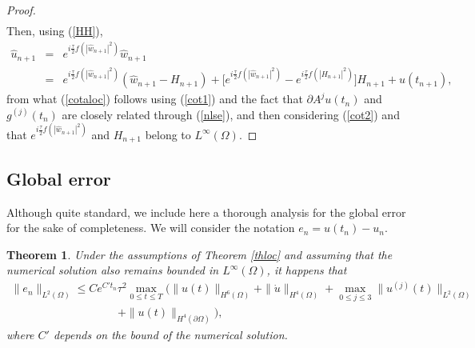 \documentclass[a4paper,12pt]{article}
\newtheorem{theorem}{Theorem}
\begin{document}
\begin{proof}
\begin{eqnarray}
\label{cot2}
\end{eqnarray}
Then, using (\ref{HH}),
\begin{eqnarray}
\hat{u}_{n+1}&=&e^{i \frac{\tau}{2} f(|\hat{w}_{n+1}|^2)} \hat{w}_{n+1}
\nonumber \\
&=& e^{i \frac{\tau}{2} f(|\hat{w}_{n+1}|^2)}(\hat{w}_{n+1}-H_{n+1})+\big[e^{i \frac{\tau}{2}f(|\hat{w}_{n+1}|^2)}-e^{i \frac{\tau}{2}f(|H_{n+1}|^2)} \big]H_{n+1}+u(t_{n+1}),  \nonumber
\end{eqnarray}
from what (\ref{cotaloc}) follows using (\ref{cot1}) and the fact that $\partial A^j u(t_n)$ and $g^{(j)}(t_n)$ are closely related through (\ref{nlse}), and then considering (\ref{cot2}) and that $e^{i \frac{\tau}{2}f(|\hat{w}_{n+1}|^2)}$ and $H_{n+1}$ belong to $L^\infty(\Omega)$.
\end{proof}



\subsection{Global error }

Although quite standard, we include here a thorough analysis for the global error for the sake of completeness. We will consider the notation $e_n=u(t_n)-u_n$.


\begin{theorem} Under the assumptions of Theorem \ref{thloc} and assuming that the numerical solution also remains bounded in $L^\infty(\Omega)$, it happens that
\begin{eqnarray}
\|e_n\|_{L^2(\Omega)} \le C e^{C' t_n} \tau^2 \max_{0 \le t \le T} (\|u(t)\|_{H^6(\Omega)}+\|\dot{u}\|_{H^4(\Omega)}+\max_{0\le j \le 3} \|u^{(j)}(t)\|_{L^2(\Omega)} \nonumber \\
\hspace{4cm}+\|u(t)\|_{H^4(\partial \Omega)}),
\label{cotaglob2}
\end{eqnarray}
where $C'$ depends on the bound of the numerical solution.
\label{thglob2}
\end{theorem}
\end{document}
